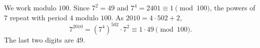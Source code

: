 We work modulo $100$. Since $7^2=49$ and $7^4=2401\equiv1\pmod{100}$, the powers of $7$ repeat with period $4$ modulo $100$. As $2010=4\cdot502+2$,
\[7^{2010}=\left(7^4\right)^{502}\cdot7^2\equiv1\cdot49\pmod{100}.\]
The last two digits are $\boxed{49}$.
